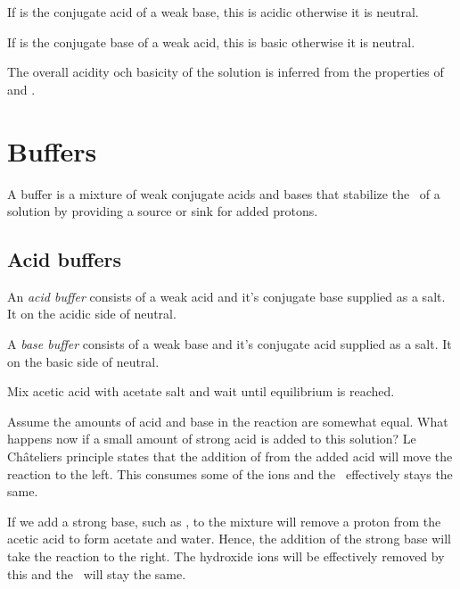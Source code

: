 \documentclass[../mit-general-chemistry.tex]{subfiles}
\begin{document}
If  is the conjugate acid of a weak base, this is acidic
otherwise it is neutral.

If  is the conjugate base of a weak acid, this is basic
otherwise it is neutral.

The overall acidity och basicity of the solution is inferred from the
properties of  and .



\section{Buffers}

A buffer is a mixture of weak conjugate acids and bases that stabilize
the \pH\ of a solution by providing a source or sink for added
protons.



\subsection{Acid buffers}


An {\em
  acid buffer} consists of a weak acid and it's conjugate base
supplied as a salt. It on the acidic side of neutral.


A {\em base
  buffer} consists of a weak base and it's conjugate acid supplied as
a salt. It on the basic side of neutral.



\begin{example}
  Mix acetic acid with acetate salt and wait until equilibrium is
  reached.


  Assume the amounts of acid and base in the reaction are somewhat
  equal. What happens now if a small amount of strong acid is added to
  this solution? Le Châteliers principle states that the addition of
   from the added acid will move the reaction to the
  left. This consumes some of the  ions and the
  \pH\ effectively stays the same.

  If we add a strong base, such as , to the mixture 
  will remove a proton from the acetic acid to form acetate and
  water. Hence, the addition of the strong base will take the reaction
  to the right. The hydroxide ions will be effectively removed by this
  and the \pH\ will stay the same.
\end{example}
\end{document}
